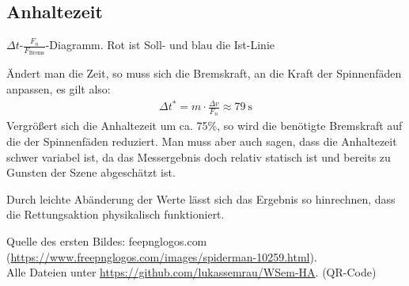 \documentclass[a4paper, 11pt, nofonts, 
twoside, sfsidenotes, nobib, justified]{tufte-handout}
\begin{document}
\subsection{Anhaltezeit}
\begin{marginfigure}
	\vspace{2cm}
	\centering
	\caption{$\Delta t$-$\frac{F_n}{F_\text{Brems}}$-Diagramm. Rot ist Soll- und blau die Ist-Linie}
\end{marginfigure}
Ändert man die Zeit, so muss sich die Bremskraft, an die Kraft der Spinnenfäden anpassen, es gilt also:
\begin{align*}
	\Delta t^* = m \cdot \frac{\Delta v}{F_n} \approx\SI{79}{\second}
\end{align*}
Vergrößert sich die Anhaltezeit um ca. 75\%, so wird die benötigte Bremskraft auf die der Spinnenfäden reduziert.
Man muss aber auch sagen, dass die Anhaltezeit schwer variabel ist, da das Messergebnis doch relativ statisch ist und bereits zu Gunsten der Szene abgeschätzt ist.
\begin{mdframed}[style = wichtig, frametitle = Fazit]
	Durch leichte Abänderung der Werte lässt sich das Ergebnis so hinrechnen, dass die Rettungsaktion physikalisch funktioniert.
\end{mdframed}
\printbibliography
{}
Quelle des ersten Bildes: feepnglogos.com (\url{https://www.freepnglogos.com/images/spiderman-10259.html}).\\ Alle Dateien unter \url{https://github.com/lukassemrau/WSem-HA}. (QR-Code)
\end{document}
